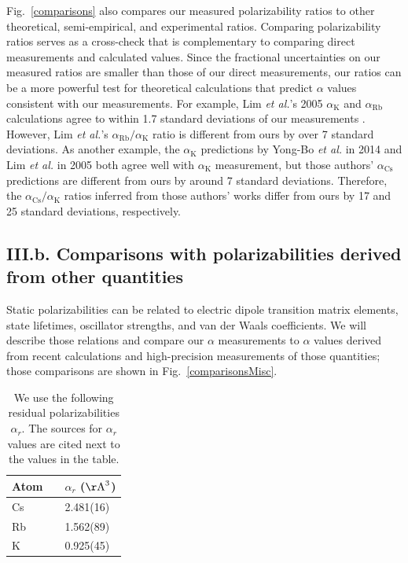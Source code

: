 \documentclass[twocolumn,prl,showpacs,superscriptaddress]{revtex4-1}   %
\newcommand{\figref}[1]{Fig.~\ref{#1}}
\newcommand{\ak}{\alpha_{\textrm{K}}}
\newcommand{\arb}{\alpha_{\textrm{Rb}}}
\newcommand{\acs}{\alpha_{\textrm{Cs}}}
\newcommand{\etal}{\textit{et al.}}
\newcommand{\etalspace}{\textit{et al. }}
\newcommand{\AAA}{\mathrm{\AA}}
\begin{document}
\figref{comparisons} also compares our measured polarizability ratios to other theoretical, semi-empirical, and experimental ratios. Comparing polarizability ratios serves as a cross-check that is complementary to comparing direct measurements and calculated values. Since the fractional uncertainties on our measured ratios are smaller than those of our direct measurements, our ratios can be a more powerful test for theoretical calculations that predict $\alpha$ values consistent with our measurements. 
For example, Lim \etal's 2005 $\ak$ and $\arb$ calculations agree to within 1.7 standard deviations of our measurements \cite{Lim2005}. However, Lim \etal's $\arb/\ak$ ratio is different from ours by over 7 standard deviations. As another example, the $\ak$ predictions by Yong-Bo \etalspace in 2014 \cite{Y.-B.2014} and Lim \etalspace in 2005 \cite{Lim2005} both agree well with $\ak$ measurement, but those authors' $\acs$ predictions are different from ours by around 7 standard deviations. Therefore, the $\acs/\ak$ ratios inferred from those authors' works differ from ours by 17 and 25 standard deviations, respectively. 

\subsection{III.b. Comparisons with polarizabilities derived from other quantities}

Static polarizabilities can be related to electric dipole transition matrix elements, state lifetimes, oscillator strengths, and van der Waals coefficients. We will describe those relations and compare our $\alpha$ measurements to $\alpha$ values derived from recent calculations and high-precision measurements of those quantities; those comparisons are shown in \figref{comparisonsMisc}.

\begingroup
\begin{table}
\caption{\label{tableOmegaRes}We use the following residual polarizabilities $\alpha_r$.
The sources for $\alpha_r$ values are cited next to the values in the table.}
\begin{center}
\begin{tabular}{ll}
\hline\hline
Atom$\quad$ & $\alpha_r$ ($\AAA^3$) \\
\hline
Cs & 2.481(16) \cite{Derevianko2001} \\
Rb & 1.562(89) \cite{Safronova2006} \\
K  & 0.925(45) \cite{Safronova2006} \\
\hline\hline
\end{tabular}
\end{center}
\end{table}
\endgroup
\end{document}

